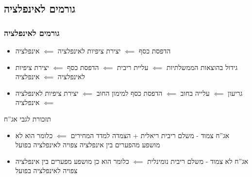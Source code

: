 \documentclass[10pt,usenames,dvipsnames]{beamer}
\begin{document}
\begin{RTL}
\section{גורמים לאינפלציה}
\begin{frame}[allowframebreaks]
    \frametitle{גורמים לאינפלציה}
    \begin{itemize}
        \item הדפסת כסף $\impliedby$ יצירת ציפיות לאינפלציה $\impliedby$ אינפלציה
        \item גידול בהוצאות הממשלתיות $\impliedby$ עליית ריבית $\impliedby$ הדפסת כסף $\impliedby$ יצירת ציפיות לאינפלציה $\impliedby$ אינפלציה
        \item גריעון $\impliedby$ עלייה בחוב $ \impliedby$ הדפסת כסף למימון החוב $\impliedby$ יצירת ציפיות לאינפלציה $\impliedby$ אינפלציה
    \end{itemize}
    
    \framebreak

    \begin{block}{תזכורת לגבי אג''ח}
        \begin{itemize}
        \item  אג''ח צמוד - משלם ריבית ריאלית + הצמדה למדד המחירים $\impliedby$ כלומר הוא לא מושפע מהפערים בין אינפלציה צפויה לאינפלציה בפועל
        \item אג''ח לא צמוד - משלם ריבית נומינלית $\impliedby$ כלומר הוא כן מושפע מפערים בין אינפלציה צפויה לאינפלציה בפועל
        \end{itemize}
        
    \end{block}

\end{frame}
\end{RTL}
\end{document}

